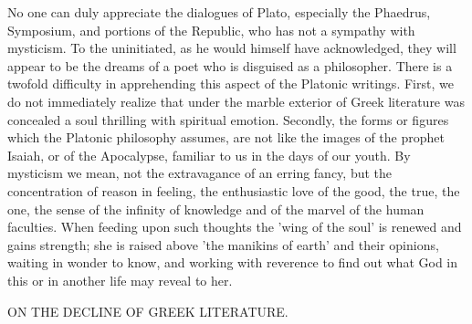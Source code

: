 \documentclass[11pt,letter]{article}
\begin{document}
\par  No one can duly appreciate the dialogues of Plato, especially the Phaedrus, Symposium, and portions of the Republic, who has not a sympathy with mysticism. To the uninitiated, as he would himself have acknowledged, they will appear to be the dreams of a poet who is disguised as a philosopher. There is a twofold difficulty in apprehending this aspect of the Platonic writings. First, we do not immediately realize that under the marble exterior of Greek literature was concealed a soul thrilling with spiritual emotion. Secondly, the forms or figures which the Platonic philosophy assumes, are not like the images of the prophet Isaiah, or of the Apocalypse, familiar to us in the days of our youth. By mysticism we mean, not the extravagance of an erring fancy, but the concentration of reason in feeling, the enthusiastic love of the good, the true, the one, the sense of the infinity of knowledge and of the marvel of the human faculties. When feeding upon such thoughts the 'wing of the soul' is renewed and gains strength; she is raised above 'the manikins of earth' and their opinions, waiting in wonder to know, and working with reverence to find out what God in this or in another life may reveal to her.

\par  ON THE DECLINE OF GREEK LITERATURE.
\end{document}
